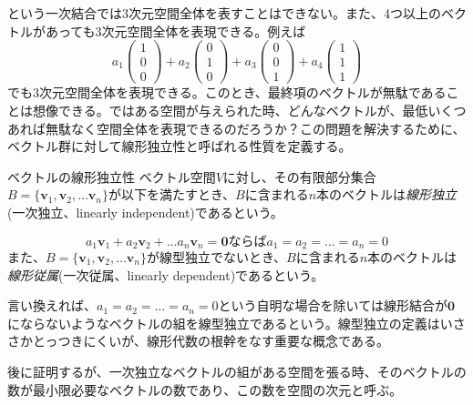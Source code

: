 という一次結合では3次元空間全体を表すことはできない。また、4つ以上のベクトルがあっても3次元空間全体を表現できる。例えば
\begin{equation}
	a_1 \begin{pmatrix} 1 \\0 \\ 0 \end{pmatrix}+a_2\begin{pmatrix} 0 \\1 \\ 0 \end{pmatrix}+a_3\begin{pmatrix} 0 \\0 \\ 1 \end{pmatrix}+a_4\begin{pmatrix} 1 \\1 \\ 1 \end{pmatrix}
\end{equation}
でも3次元空間全体を表現できる。このとき、最終項のベクトルが無駄であることは想像できる。ではある空間が与えられた時、どんなベクトルが、最低いくつあれば無駄なく空間全体を表現できるのだろうか？この問題を解決するために、ベクトル群に対して線形独立性と呼ばれる性質を定義する。
\begin{definition*}{ベクトルの線形独立性}
	ベクトル空間\(V\)に対し、その有限部分集合\(B=\{\boldsymbol{v}_1,\boldsymbol{v}_2,\dots\boldsymbol{v}_n\}\)が以下を満たすとき、\(B\)に含まれる\(n\)本のベクトルは\emph{線形独立}(一次独立、linearly independent)であるという。

	\begin{equation}
		a_1\boldsymbol{v}_1+a_2\boldsymbol{v}_2+\dots a_n\boldsymbol{v}_n  =\boldsymbol{0} ならば a_1=a_2=\dots=a_n=0
	\end{equation}
	また、\(B=\{\boldsymbol{v}_1,\boldsymbol{v}_2,\dots\boldsymbol{v}_n\}\)が線型独立でないとき、\(B\)に含まれる\(n\)本のベクトルは\emph{線形従属}(一次従属、linearly dependent)であるという。
\end{definition*}
言い換えれば、\(a_1=a_2=\dots=a_n=0\)という自明な場合を除いては線形結合が\(\boldsymbol{0}\)にならないようなベクトルの組を線型独立であるという。線型独立の定義はいささかとっつきにくいが、線形代数の根幹をなす重要な概念である。

後に証明するが、一次独立なベクトルの組がある空間を張る時、そのベクトルの数が最小限必要なベクトルの数であり、この数を空間の次元と呼ぶ。

